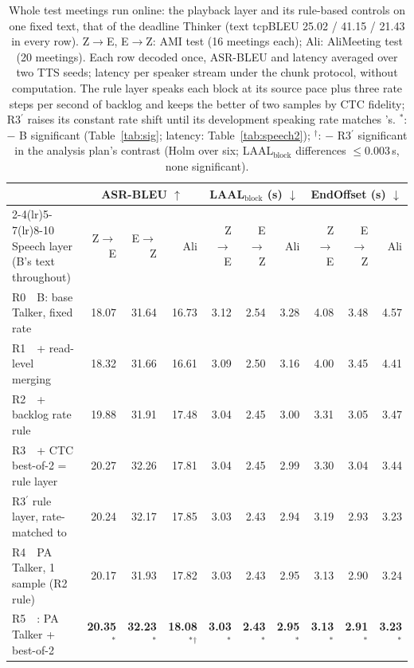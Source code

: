 \begin{table}[t]
\centering\small
\setlength{\tabcolsep}{4pt}
\begin{tabular}{lrrrrrrrrr}
\toprule
 & \multicolumn{3}{c}{ASR-BLEU $\uparrow$} & \multicolumn{3}{c}{LAAL$_\text{block}$ (s) $\downarrow$} & \multicolumn{3}{c}{EndOffset (s) $\downarrow$} \\
\cmidrule(lr){2-4}\cmidrule(lr){5-7}\cmidrule(lr){8-10}
Speech layer (B's text throughout) & Z$\rightarrow$E & E$\rightarrow$Z & Ali & Z$\rightarrow$E & E$\rightarrow$Z & Ali & Z$\rightarrow$E & E$\rightarrow$Z & Ali \\
\midrule
R0\ \ B: base Talker, fixed rate & 18.07 & 31.64 & 16.73 & 3.12 & 2.54 & 3.28 & 4.08 & 3.48 & 4.57 \\
R1\ \ + read-level merging & 18.32 & 31.66 & 16.61 & 3.09 & 2.50 & 3.16 & 4.00 & 3.45 & 4.41 \\
R2\ \ + backlog rate rule & 19.88 & 31.91 & 17.48 & 3.04 & 2.45 & 3.00 & 3.31 & 3.05 & 3.47 \\
R3\ \ + CTC best-of-2 = rule layer & 20.27 & 32.26 & 17.81 & 3.04 & 2.45 & 2.99 & 3.30 & 3.04 & 3.44 \\
R3$^\prime$ rule layer, rate-matched to \sys{} & 20.24 & 32.17 & 17.85 & 3.03 & 2.43 & 2.94 & 3.19 & 2.93 & 3.23 \\
\midrule
R4\ \ PA Talker, 1 sample (R2 rule) & 20.17 & 31.93 & 17.82 & 3.03 & 2.43 & 2.95 & 3.13 & 2.90 & 3.24 \\
\midrule
R5\ \ \sys{}: PA Talker + best-of-2 & \textbf{20.35}$^{*}$ & \textbf{32.23}$^{*}$ & \textbf{18.08}$^{*}$$^{\dagger}$ & \textbf{3.03}$^{*}$ & \textbf{2.43}$^{*}$ & \textbf{2.95}$^{*}$ & \textbf{3.13}$^{*}$ & \textbf{2.91}$^{*}$ & \textbf{3.23}$^{*}$ \\
\bottomrule
\end{tabular}
\caption{Whole test meetings run online: the playback layer and its rule-based controls on one fixed text, that of the deadline Thinker (text tcpBLEU 25.02 / 41.15 / 21.43 in every row). Z$\rightarrow$E, E$\rightarrow$Z: AMI test (16 meetings each); Ali: AliMeeting test (20 meetings). Each row decoded once, ASR-BLEU and latency averaged over two TTS seeds; latency per speaker stream under the chunk protocol, without computation. The rule layer speaks each block at its source pace plus three rate steps per second of backlog and keeps the better of two samples by CTC fidelity; R3$^\prime$ raises its constant rate shift until its development speaking rate matches \sys{}'s. $^{*}$: \sys{} $-$ B significant (Table~\ref{tab:sig}; latency: Table~\ref{tab:speech2}); $^{\dagger}$: \sys{} $-$ R3$^\prime$ significant in the analysis plan's contrast (Holm over six; LAAL$_\text{block}$ differences $\le$0.003\,s, none significant).}
\label{tab:main}
\end{table}

